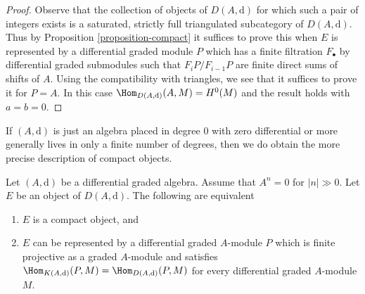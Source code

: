 \begin{proof}
Observe that the collection of objects of $D(A, \text{d})$ for which
such a pair of integers exists is a saturated, strictly full triangulated
subcategory of $D(A, \text{d})$.
Thus by Proposition \ref{proposition-compact} it suffices to prove
this when $E$ is represented by a differential graded module $P$ which
has a finite filtration $F_\bullet$ by differential graded submodules
such that $F_iP/F_{i - 1}P$ are finite direct sums of shifts of $A$.
Using the compatibility with triangles, we see that it suffices
to prove it for $P = A$. In this case $\Hom_{D(A, \text{d})}(A, M) = H^0(M)$
and the result holds with $a = b = 0$.
\end{proof}

\noindent
If $(A, \text{d})$ is just an algebra placed in degree $0$
with zero differential or more generally lives in
only a finite number of degrees, then we do obtain the
more precise description of compact objects.

\begin{lemma}
\label{lemma-compact}
Let $(A, \text{d})$ be a differential graded algebra. Assume that $A^n = 0$
for $|n| \gg 0$. Let $E$ be an object of $D(A, \text{d})$.
The following are equivalent
\begin{enumerate}
\item $E$ is a compact object, and
\item $E$ can be represented by a differential graded $A$-module $P$
which is finite projective as a graded $A$-module and satisfies
$\Hom_{K(A, \text{d})}(P, M) = \Hom_{D(A, \text{d})}(P, M)$
for every differential graded $A$-module $M$.
\end{enumerate}
\end{lemma}

